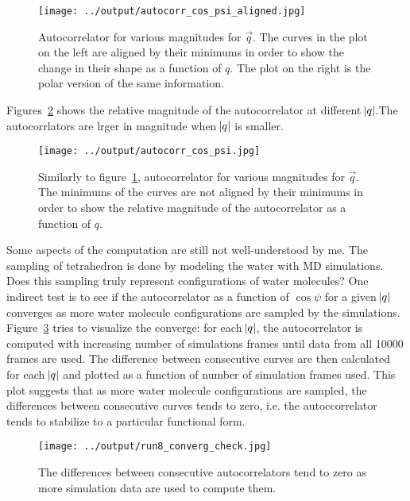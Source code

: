 \documentclass[20pt]{article}
\begin{document}
\begin{figure}[!h] 
  \centering
    \texttt{[image: ../output/autocorr\_cos\_psi\_aligned.jpg]}
     \caption{Autocorrelator for various magnitudes for $\vec{q}$. The curves in the plot on the left are aligned by their minimums in order to show the change in their shape as a function of $q$. The plot on the right is the polar version of the same information.} \label{fig:autocorr_aligned}
\end{figure}

Figures~\ref{fig:autocorr} shows the relative magnitude of the autocorrelator at different $\abs{q}$.The autocorrlators are lrger in magnitude when $\abs{q}$ is smaller.

\begin{figure}[!h]
  \centering
    \texttt{[image: ../output/autocorr\_cos\_psi.jpg]}
     \caption{Similarly to figure~\ref{fig:autocorr_aligned}, autocorrelator for various magnitudes for $\vec{q}$. The minimums of the curves are not aligned by their minimums in order to show the relative magnitude of the autocorrelator as a function of $q$.} \label{fig:autocorr}
\end{figure}

Some aspects of the computation are still not well-understood by me. The sampling of tetrahedron is done by modeling the water with MD simulations. Does this sampling truly represent configurations of water molecules? One indirect test is to see if the autocorrelator as a function of $\cos{\psi}$ for a given $\abs{q}$ converges as more water molecule configurations are sampled by the simulations. Figure~\ref{fig:autocorr_converge} tries to visualize the converge: for each $\abs{q}$, the autocorrelator is computed with increasing number of simulations frames until data from all 10000 frames are used. The difference between consecutive curves are then calculated for each $\abs{q}$ and plotted as a function of number of simulation frames used. This plot suggests that as more water molecule configurations are sampled, the differences between consecutive curves tends to zero, i.e. the autoccorrelator tends to stabilize to a particular functional form.

\begin{figure}[!h]
  \centering
    \texttt{[image: ../output/run8\_converg\_check.jpg]}
     \caption{The differences between consecutive autocorrelators tend to zero as more simulation data are used to compute them.} \label{fig:autocorr_converge}
\end{figure}
\end{document}
